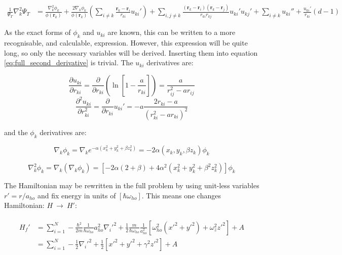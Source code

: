 \documentclass[english, a4paper]{article}
\newcommand{\bm}[1]{\mathbf{#1}}
\begin{document}
\begin{align}
\frac{1}{\Psi_T}\nabla_k^2\Psi_T &= \frac{\nabla_k^2\phi_k}{\phi(\bm{r}_k)} + \frac{2\nabla_k\phi_k}{\phi(\bm{r}_k)}\left(\sum_{i\neq k} \frac{\bm{r}_k - \bm{r}_i}{r_{ki}} u_{ki}' \right) + \sum_{i,j\neq k}\frac{(\bm{r}_k - \bm{r}_i)(\bm{r}_k - \bm{r}_j)}{r_{ki}r_{kj}}u_{ki}'u_{kj}' + \sum_{i\neq k} u_{ki}'' + \frac{u_{ki}'}{r_{ki}} \left(d - 1\right)
\label{eq:full_second_derivative}
\end{align}

As the exact forms of $\phi_k$ and $u_{ki}$ are known, this can be written to a more recognisable, and calculable, expression. However, this expression will be quite long, so only the necessary variables will be derived. Inserting them into equation \ref{eq:full_second_derivative} is trivial. The $u_{ki}$ derivatives are:

\begin{equation}
	\frac{\partial u_{ki}}{\partial r_{ki}} = \frac{\partial}{\partial r_{ki}}\left(\ln\left[1-\frac{a}{r_{ki}}\right]\right) = \frac{a}{r_{ij}^2 - ar_{ij}}
\end{equation}
\begin{equation}
	\frac{\partial^2 u_{ki}}{\partial r_{ki}^2} = \frac{\partial}{\partial r_{ki}} u_{ki}' = -a\frac{2r_{ki} - a}{(r_{ki}^2 - ar_{ki})^2}
\end{equation}

and the $\phi_k$ derivatives are:

\begin{equation}
	\nabla_k\phi_k = \nabla_k e^{-\alpha(x_k^2 + y_k^2 + \beta z_k^2)} = -2\alpha(x_k,y_k,\beta z_k)\phi_k
\end{equation}

\begin{equation}
\nabla_k^2\phi_k = \nabla_k (\nabla_k\phi_k) = \left[-2\alpha(2+\beta) + 4\alpha^2(x_k^2 + y_k^2 + \beta^2 z_k^2)\right]\phi_k
\end{equation}

The Hamiltonian may be rewritten in the full problem by using unit-less variables $r' = r/a_{ho}$ and fix energy in units of $[\hbar\omega_{ho}]$. This means one changes Hamiltonian: $H\:\rightarrow\: H'$:

\begin{align}
	\begin{split}
	H_f' &= \sum_{i=1}^{N}-\frac{\hbar^2}{2m} \frac{1}{\hbar\omega_{ho}}a_{ho}^2\nabla_i'^2 + \frac{1}{2}\frac{m}{\hbar\omega_{ho}}\frac{1}{a_{ho}^2}\left[ \omega_{ho}^2(x'^2+y'^2) + \omega_z^2z'^2 \right] + A\\
	&= \sum_{i=1}^{N}-\frac{1}{2}\nabla_i'^2 + \frac{1}{2}\left[ x'^2+y'^2 + \gamma^2z'^2 \right] + A
	\end{split}
\end{align}
\end{document}
